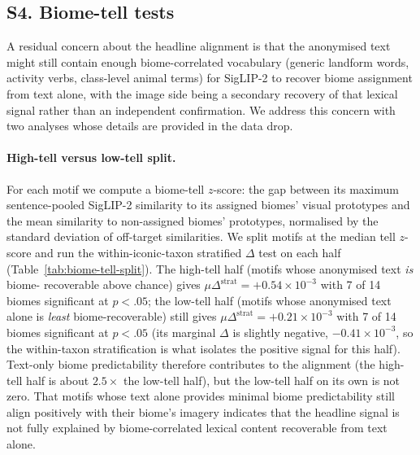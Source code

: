 \documentclass[11pt,a4paper]{article}
\begin{document}
\subsection*{S4. Biome-tell tests}\label{sec:biome-tell}

A residual concern about the headline alignment is that the
anonymised text might still contain enough biome-correlated
vocabulary (generic landform words, activity verbs,
class-level animal terms) for SigLIP-2 to recover biome
assignment from text alone, with the image side being a
secondary recovery of that lexical signal rather than an
independent confirmation. We address this concern with two
analyses whose details are provided in the data drop.

\paragraph*{High-tell versus low-tell split.} For each motif we
compute a biome-tell $z$-score: the gap between its maximum
sentence-pooled SigLIP-2 similarity to its assigned biomes'
visual prototypes and the mean similarity to non-assigned
biomes' prototypes, normalised by the standard deviation of
off-target similarities. We split motifs at the median tell
$z$-score and run the within-iconic-taxon stratified $\Delta$
test on each half (Table~\ref{tab:biome-tell-split}). The
high-tell half (motifs whose anonymised text \emph{is} biome-
recoverable above chance) gives $\mu\Delta^{\text{strat}} =
+0.54\times 10^{-3}$ with 7 of 14 biomes significant at $p<.05$;
the low-tell half (motifs whose anonymised text alone is
\emph{least} biome-recoverable) still gives $\mu\Delta^{
\text{strat}} = +0.21\times 10^{-3}$ with 7 of 14 biomes
significant at $p<.05$ (its marginal $\Delta$ is slightly negative,
$-0.41\times 10^{-3}$, so the within-taxon stratification is what
isolates the positive signal for this half). Text-only biome
predictability therefore
contributes to the alignment (the high-tell half is about $2.5
\times$ the low-tell half), but the low-tell half on its own is
not zero. That motifs whose text alone provides minimal biome
predictability still align positively with their biome's
imagery indicates that the headline signal is not fully
explained by biome-correlated lexical content recoverable from
text alone.
\end{document}
